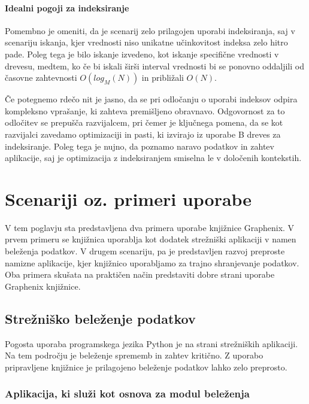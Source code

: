 \documentclass[a4paper,12pt,openright]{book}
\begin{document}
    \subsubsection{Idealni pogoji za indeksiranje}
    Pomembno je omeniti, da je scenarij zelo prilagojen uporabi indeksiranja, saj v scenariju iskanja, kjer vrednosti niso unikatne učinkovitost indeksa zelo hitro pade. Poleg tega je bilo iskanje izvedeno, kot iskanje specifične vrednosti v drevesu, medtem, ko če bi iskali širši interval vrednosti bi se ponovno oddaljili od časovne zahtevnosti $O(log_M(N))$ in približali $O(N)$.

    Če potegnemo rdečo nit je jasno, da se pri odločanju o uporabi indeksov odpira kompleksno vprašanje, ki zahteva premišljeno obravnavo. Odgovornost za to odločitev se prepušča razvijalcem, pri čemer je ključnega pomena, da se kot razvijalci zavedamo optimizaciji in pasti, ki izvirajo iz uporabe B dreves za indeksiranje. Poleg tega je nujno, da poznamo naravo podatkov in zahtev aplikacije, saj je optimizacija z indeksiranjem smiselna le v določenih kontekstih.

\chapter{Scenariji oz. primeri uporabe}
\label{ch3}

    V tem poglavju sta predstavljena dva primera uporabe knjižnice Graphenix. V prvem primeru se knjižnica uporablja kot dodatek strežniški aplikaciji v namen beleženja podatkov. V drugem scenariju, pa je predstavljen razvoj preproste namizne aplikacije, kjer knjižnico uporabljamo za trajno shranjevanje podatkov. Oba primera skušata na praktičen način predstaviti dobre strani uporabe Graphenix knjižnice.

    \section{Strežniško beleženje podatkov}

    Pogosta uporaba programskega jezika Python je na strani strežniških aplikaciji. Na tem področju je beleženje sprememb in zahtev kritično. Z uporabo pripravljene knjižnice je prilagojeno beleženje podatkov lahko zelo preprosto.

    \subsection{Aplikacija, ki služi kot osnova za modul beleženja}
\end{document}
